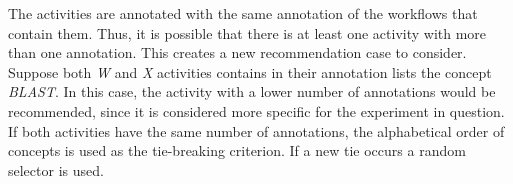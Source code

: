 \documentclass[10pt,letterpaper]{article}
\begin{document}
The activities are annotated with the same annotation of the workflows that contain them. Thus, it is possible that there is at least one activity with more than one annotation. This creates a new recommendation case to consider. Suppose both \emph{W} and \emph{X} activities contains in their annotation lists the concept \emph{BLAST}. In this case, the activity with a lower number of annotations would be recommended, since it is considered more specific for the experiment in question. If both activities have the same number of annotations, the alphabetical order of concepts is used as the tie-breaking criterion. If a new tie occurs a random selector is used.
\end{document}
